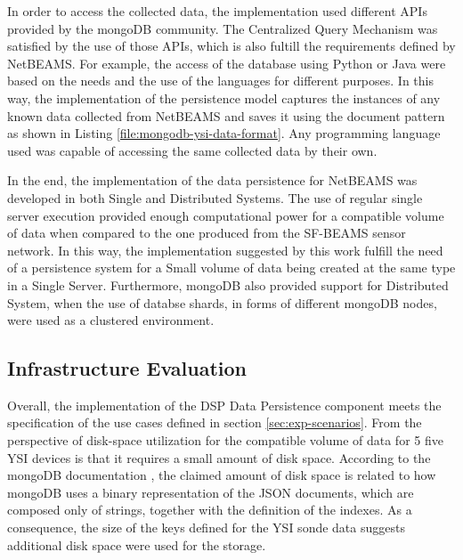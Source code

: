In order to access the collected data, the implementation used different APIs
provided by the mongoDB community. The Centralized Query Mechanism was
satisfied by the use of those APIs, which is also fultill the requirements
defined by NetBEAMS. For example, the access of the database using Python or
Java were based on the needs and the use of the languages for different
purposes. In this way, the implementation of the persistence model captures
the instances of any known data collected from NetBEAMS and saves it using the
document pattern as shown in Listing \ref{file:mongodb-ysi-data-format}. Any
programming language used was capable of accessing the same collected data by
their own. 

In the end, the implementation of the data persistence for NetBEAMS was
developed in both Single and Distributed Systems. The use of regular single
server execution provided enough computational power for a compatible volume of
data when compared to the one produced from the SF-BEAMS sensor network. In
this way, the implementation suggested by this work fulfill the need of a
persistence system for a Small volume of data being created at the same type
in a Single Server. Furthermore, mongoDB also provided support for Distributed
System, when the use of databse shards, in forms of different mongoDB nodes,
were used as a clustered environment.

\subsection{Infrastructure Evaluation}

Overall, the implementation of the DSP Data Persistence component meets the
specification of the use cases defined in section \ref{sec:exp-scenarios}.
From the perspective of disk-space utilization for the compatible volume of
data for 5 five YSI devices is that it requires a small amount of disk space.
According to the mongoDB documentation \cite{mongodb}, the claimed amount of
disk space is related to how mongoDB uses a binary representation of the JSON
documents, which are composed only of strings, together with the definition of
the indexes. As a consequence, the size of the keys defined for the YSI sonde
data suggests additional disk space were used for the storage.

